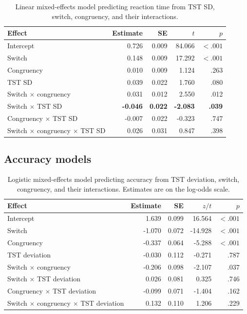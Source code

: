 \documentclass[12pt,a4paper]{report}
\begin{document}
\begin{appendices}
\begin{table}[H]
\centering
\small
\caption{Linear mixed-effects model predicting reaction time from TST SD, switch, congruency, and their interactions.}
\label{tab:app_rt_tstsd}
\begin{tabularx}{\textwidth}{Xrrrr}
\toprule
Effect & Estimate & SE & $t$ & $p$ \\
\midrule
Intercept & 0.726 & 0.009 & 84.066 & $< .001$ \\
Switch & 0.148 & 0.009 & 17.292 & $< .001$ \\
Congruency & 0.010 & 0.009 & 1.124 & .263 \\
TST SD & 0.039 & 0.022 & 1.760 & .080 \\
Switch $\times$ congruency & 0.031 & 0.012 & 2.550 & .012 \\
Switch $\times$ TST SD & \textbf{-0.046} & \textbf{0.022} & \textbf{-2.083} & \textbf{.039} \\
Congruency $\times$ TST SD & -0.007 & 0.022 & -0.323 & .747 \\
Switch $\times$ congruency $\times$ TST SD & 0.026 & 0.031 & 0.847 & .398 \\
\bottomrule
\end{tabularx}
\end{table}


\subsection{Accuracy models}
\label{app:mixed_models_accuracy}

\begin{table}[H]
\centering
\small
\caption{Logistic mixed-effects model predicting accuracy from TST deviation, switch, congruency, and their interactions. Estimates are on the log-odds scale.}
\label{tab:app_acc_tstdev}
\begin{tabularx}{\textwidth}{Xrrrr}
\toprule
Effect & Estimate & SE & $z/t$ & $p$ \\
\midrule
Intercept & 1.639 & 0.099 & 16.564 & $< .001$ \\
Switch & -1.070 & 0.072 & -14.928 & $< .001$ \\
Congruency & -0.337 & 0.064 & -5.288 & $< .001$ \\
TST deviation & -0.030 & 0.112 & -0.271 & .787 \\
Switch $\times$ congruency & -0.206 & 0.098 & -2.107 & .037 \\
Switch $\times$ TST deviation & 0.026 & 0.081 & 0.325 & .746 \\
Congruency $\times$ TST deviation & -0.099 & 0.071 & -1.404 & .162 \\
Switch $\times$ congruency $\times$ TST deviation & 0.132 & 0.110 & 1.206 & .229 \\
\bottomrule
\end{tabularx}
\end{table}


\end{appendices}
\end{document}
